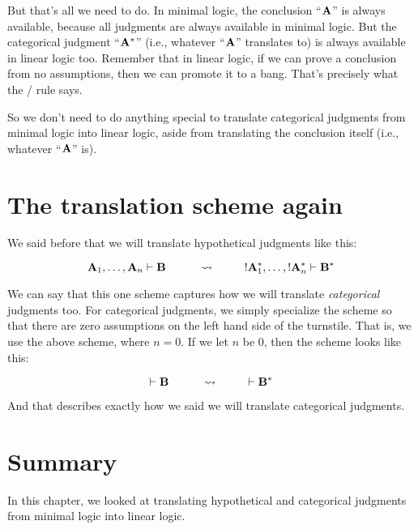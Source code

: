 \documentclass[../../../main.tex]{subfiles}
\begin{document}
\noindent
But that's all we need to do. In minimal logic, the conclusion ``$\mathbf{A}$'' is always available, because all judgments are always available in minimal logic. But the categorical judgment ``$\mathbf{A}^{*}$'' (i.e., whatever ``$\mathbf{A}$'' translates to) is always available in linear logic too. Remember that in linear logic, if we can prove a conclusion from no assumptions, then we can promote it to a bang. That's precisely what the \bangIntro/ rule says. 

So we don't need to do anything special to translate categorical judgments from minimal logic into linear logic, aside from translating the conclusion itself (i.e., whatever ``$\mathbf{A}$'' is).


\section{The translation scheme again}

We said before that we will translate hypothetical judgments like this:

\begin{equation*}
  \nd{A}_{1}, \ldots, \nd{A}_{n} \ndturnstile/ \nd{B}
  \hskip 1cm \rightsquigarrow \hskip 1cm
  \bang/\nd{A}_{1}^{*}, \ldots, \bang/\nd{A}_{n}^{*} \ndturnstile/ \nd{B}^{*}
\end{equation*}

\noindent
We can say that this one scheme captures how we will translate \emph{categorical} judgments too. For categorical judgments, we simply specialize the scheme so that there are zero assumptions on the left hand side of the turnstile. That is, we use the above scheme, where $n = 0$. If we let $n$ be $0$, then the scheme looks like this:

\begin{equation*}
  \ndturnstile/ \nd{B}
  \hskip 1cm \rightsquigarrow \hskip 1cm
  \ndturnstile/ \nd{B}^{*}
\end{equation*}

\noindent
And that describes exactly how we said we will translate categorical judgments.

 
\section{Summary}

In this chapter, we looked at translating hypothetical and categorical judgments from minimal logic into linear logic. 
\end{document}
